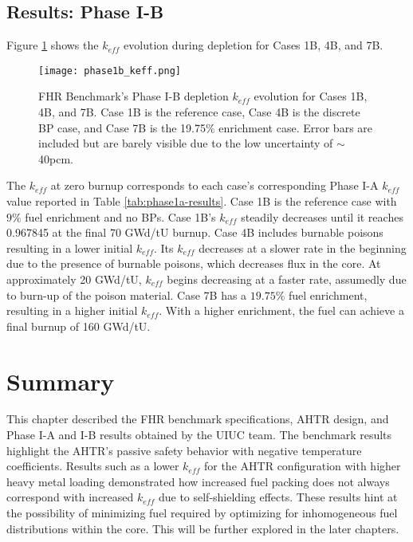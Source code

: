 \subsection{Results: Phase I-B}
Figure \ref{fig:phase1b_keff} shows the $k_{eff}$ evolution during depletion 
for Cases 1B, 4B, and 7B.
\begin{figure}[]
    \centering
    \texttt{[image: phase1b\_keff.png]} 
    \caption{\acrlong{FHR} Benchmark's Phase I-B depletion $k_{eff}$ evolution 
    for Cases 1B, 4B, and 7B. Case 1B is the reference case, Case 4B is the 
    discrete \gls{BP} case, and Case 7B is the 19.75$\%$ enrichment case. 
    Error bars are included but are barely visible due to the low uncertainty 
    of $\sim$40pcm.}
    \label{fig:phase1b_keff}
\end{figure}
The $k_{eff}$ at zero burnup corresponds to each case's 
corresponding Phase I-A $k_{eff}$ value reported in Table \ref{tab:phase1a-results}. 
Case 1B is the reference case with $9\%$ fuel enrichment and no \glspl{BP}. 
Case 1B's $k_{eff}$ steadily decreases until it reaches 0.967845 at the final 70 
GWd/tU burnup. 
Case 4B includes burnable poisons resulting in a lower initial $k_{eff}$. 
Its $k_{eff}$ decreases at a slower rate in the beginning due to the presence of 
burnable poisons, which decreases flux in the core. 
At approximately 20 GWd/tU, $k_{eff}$ begins decreasing at a faster rate, assumedly
due to burn-up of the poison material.   
Case 7B has a $19.75\%$ fuel enrichment, resulting in a higher initial $k_{eff}$. 
With a higher enrichment, the fuel can achieve a final burnup of 160 GWd/tU. 

\section{Summary}

This chapter described the \gls{FHR} benchmark specifications, \gls{AHTR} design,
and Phase I-A and I-B results obtained by the UIUC team. 
The benchmark results highlight the \gls{AHTR}'s passive safety behavior with 
negative temperature coefficients. 
Results such as a lower $k_{eff}$ for the \gls{AHTR} configuration with 
higher heavy metal loading demonstrated how increased fuel packing does not always 
correspond with increased $k_{eff}$ due to self-shielding effects.
These results hint at the possibility of minimizing fuel required by optimizing 
for inhomogeneous fuel distributions within the core. 
This will be further explored in the later chapters. 

